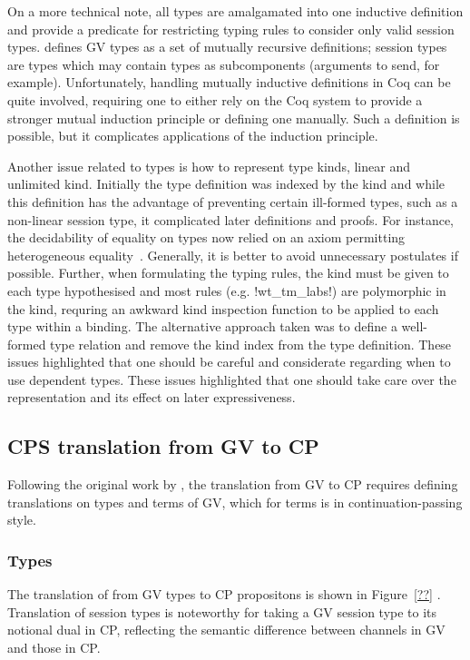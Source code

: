 On a more technical note, all types are amalgamated into one inductive
definition and provide a predicate for restricting typing rules to consider
only valid session types. \citeauthor{Wadler:2014} defines GV types as a set
of mutually recursive definitions; session types are types which may contain
types as subcomponents (arguments to send, for example). Unfortunately,
handling mutually inductive definitions in Coq can be quite involved,
requiring one to either rely on the Coq system to provide a stronger mutual
induction principle or defining one manually. Such a definition is possible,
but it complicates applications of the induction principle.

Another issue related to types is how to represent type kinds, linear and
unlimited kind. Initially the type definition was indexed by the kind and
while this definition has the advantage of preventing certain ill-formed
types, such as a non-linear session type, it complicated later definitions and
proofs. For instance, the decidability of equality on types now relied on an
axiom permitting heterogeneous equality~\cite{McBride:1999}. Generally, it is
better to avoid unnecessary postulates if possible. Further, when formulating
the typing rules, the kind must be given to each type hypothesised and most
rules (e.g. \coqe!wt_tm_labs!) are polymorphic in the kind, requring an
awkward kind inspection function to be applied to each type within a
binding. The alternative approach taken was to define a well-formed type
relation and remove the kind index from the type definition. These issues
highlighted that one should be careful and considerate regarding when to use
dependent types. These issues highlighted that one should take care over the
representation and its effect on later expressiveness.

\subsection{CPS translation from GV to CP}\label{sec:trans}

Following the original work by \citeauthor{Wadler:2014}, the translation from
GV to CP requires defining translations on types and terms of GV, which for
terms is in continuation-passing style.

\subsubsection{Types}

The translation of from GV types to CP propositons is shown in Figure~\ref{??}
. Translation of session types is
noteworthy for taking a GV session type to its notional dual in CP, reflecting
the semantic difference between channels in GV and those in CP.

